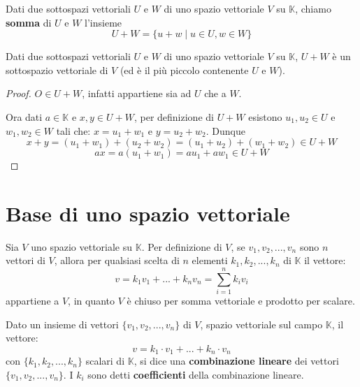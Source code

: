 \begin{definition}
	Dati due sottospazi vettoriali $U$ e $W$ di uno spazio vettoriale $V$
	su $\mathbb{K}$, chiamo \textbf{somma} di $U$ e $W$ l'insieme
	\begin{equation*}
		U + W = \{u + w \mid u \in U, w \in W\}
	\end{equation*}
\end{definition}

\begin{proposition}

	Dati due sottospazi vettoriali $U$ e $W$ di uno spazio vettoriale $V$
	su $\mathbb{K}$, $U + W$ \`e un sottospazio vettoriale di $V$ (ed
	\`e il pi\`u piccolo contenente $U$ e $W$).
	\begin{proof}
		$O \in U + W$, infatti appartiene sia ad $U$ che a $W$.

		Ora dati $a \in \mathbb{K}$ e $x, y \in U + W$, per definizione di
		$U + W$ esistono $u_1, u_2 \in U$ e $w_1, w_2 \in W$ tali che:
		$x = u_1 + w_1$ e $y = u_2 + w_2$. Dunque
		\begin{equation*}
			x + y = (u_1 + w_1) + (u_2 + w_2) = (u_1 + u_2) + (w_1 + w_2) \in U + W
		\end{equation*}
		\begin{equation*}
			ax = a(u_1 + w_1) = au_1 + aw_1 \in U + W
		\end{equation*}
	\end{proof}
\end{proposition}

\section{Base di uno spazio vettoriale}
Sia $V$ uno spazio vettoriale su $\mathbb{K}$.
Per definizione di $V$, se $v_1, v_2, ..., v_n$ sono $n$ vettori
di $V$, allora per qualsiasi scelta di $n$ elementi
$k_1, k_2, ..., k_n$ di $\mathbb{K}$ il vettore:
\begin{equation*}
	v = k_1 v_1 + ... + k_n v_n = \sum_{i=1}^n k_i v_i
\end{equation*}
appartiene a $V$, in quanto $V$ \`e chiuso per somma vettoriale
e prodotto per scalare.

\begin{definition}
	Dato un insieme di vettori $\{v_1, v_2, ..., v_n\}$ di $V$,
	spazio vettoriale sul campo $\mathbb{K}$, il vettore:
	\begin{equation*}
		v = k_1 \cdot v_1 + ... + k_n \cdot v_n
	\end{equation*}
	con $\{k_1, k_2, ..., k_n\}$ scalari di $\mathbb{K}$,
	si dice una \textbf{combinazione lineare} dei vettori
	$\{v_1, v_2, ..., v_n\}$. I $k_i$ sono detti \textbf{coefficienti}
	della combinazione lineare.
\end{definition}

